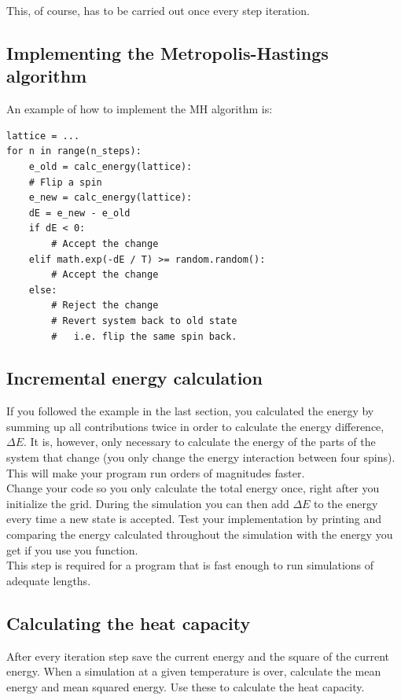 \documentclass{article}
\begin{document}
This, of course, has to be carried out once every step iteration.

\subsection{Implementing the Metropolis-Hastings algorithm}
An example of how to implement the MH algorithm is: 

\begin{lstlisting}
lattice = ...
for n in range(n_steps):
    e_old = calc_energy(lattice):
    # Flip a spin
    e_new = calc_energy(lattice):
    dE = e_new - e_old
    if dE < 0:
        # Accept the change
    elif math.exp(-dE / T) >= random.random():
        # Accept the change
    else:
        # Reject the change
        # Revert system back to old state
        #   i.e. flip the same spin back.
\end{lstlisting}

\subsection{Incremental energy calculation}

If you followed the example in the last section,
you calculated the energy by summing up all contributions twice in order to
calculate the energy difference, $\Delta E$.
It is, however, only necessary to calculate the energy of the parts of the
system that change (you only change the energy interaction between four spins).
This will make your program run orders of magnitudes faster.\\

Change your code so you only calculate the total energy once,
right after you initialize the grid.
During the simulation you can then add $\Delta E$ to the energy every
time a new state is accepted.
Test your implementation by printing and comparing the energy
calculated throughout the simulation with the energy you get if
you use you  function.\\

This step is required for a program that is fast enough to
run simulations of adequate lengths.


\subsection{Calculating the heat capacity}

After every iteration step save the current energy and the square of the current energy.
When a simulation at a given temperature is over,
calculate the mean energy and mean squared energy.
Use these to calculate the heat capacity.\\
\end{document}
